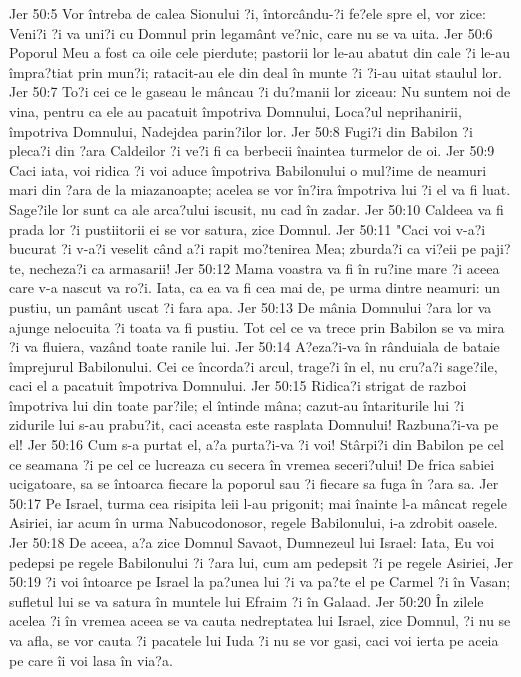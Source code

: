 Jer 50:5  Vor întreba de calea Sionului ?i, întorcându-?i fe?ele spre el, vor zice: Veni?i ?i va uni?i cu Domnul prin legamânt ve?nic, care nu se va uita.
Jer 50:6  Poporul Meu a fost ca oile cele pierdute; pastorii lor le-au abatut din cale ?i le-au împra?tiat prin mun?i; ratacit-au ele din deal în munte ?i ?i-au uitat staulul lor.
Jer 50:7  To?i cei ce le gaseau le mâncau ?i du?manii lor ziceau: Nu suntem noi de vina, pentru ca ele au pacatuit împotriva Domnului, Loca?ul neprihanirii, împotriva Domnului, Nadejdea parin?ilor lor.
Jer 50:8  Fugi?i din Babilon ?i pleca?i din ?ara Caldeilor ?i ve?i fi ca berbecii înaintea turmelor de oi.
Jer 50:9  Caci iata, voi ridica ?i voi aduce împotriva Babilonului o mul?ime de neamuri mari din ?ara de la miazanoapte; acelea se vor în?ira împotriva lui ?i el va fi luat. Sage?ile lor sunt ca ale arca?ului iscusit, nu cad în zadar.
Jer 50:10  Caldeea va fi prada lor ?i pustiitorii ei se vor satura, zice Domnul.
Jer 50:11  "Caci voi v-a?i bucurat ?i v-a?i veselit când a?i rapit mo?tenirea Mea; zburda?i ca vi?eii pe paji?te, necheza?i ca armasarii!
Jer 50:12  Mama voastra va fi în ru?ine mare ?i aceea care v-a nascut va ro?i. Iata, ca ea va fi cea mai de, pe urma dintre neamuri: un pustiu, un pamânt uscat ?i fara apa.
Jer 50:13  De mânia Domnului ?ara lor va ajunge nelocuita ?i toata va fi pustiu. Tot cel ce va trece prin Babilon se va mira ?i va fluiera, vazând toate ranile lui.
Jer 50:14  A?eza?i-va în rânduiala de bataie împrejurul Babilonului. Cei ce încorda?i arcul, trage?i în el, nu cru?a?i sage?ile, caci el a pacatuit împotriva Domnului.
Jer 50:15  Ridica?i strigat de razboi împotriva lui din toate par?ile; el întinde mâna; cazut-au întariturile lui ?i zidurile lui s-au prabu?it, caci aceasta este rasplata Domnului! Razbuna?i-va pe el!
Jer 50:16  Cum s-a purtat el, a?a purta?i-va ?i voi! Stârpi?i din Babilon pe cel ce seamana ?i pe cel ce lucreaza cu secera în vremea seceri?ului! De frica sabiei ucigatoare, sa se întoarca fiecare la poporul sau ?i fiecare sa fuga în ?ara sa.
Jer 50:17  Pe Israel, turma cea risipita leii l-au prigonit; mai înainte l-a mâncat regele Asiriei, iar acum în urma Nabucodonosor, regele Babilonului, i-a zdrobit oasele.
Jer 50:18  De aceea, a?a zice Domnul Savaot, Dumnezeul lui Israel: Iata, Eu voi pedepsi pe regele Babilonului ?i ?ara lui, cum am pedepsit ?i pe regele Asiriei,
Jer 50:19  ?i voi întoarce pe Israel la pa?unea lui ?i va pa?te el pe Carmel ?i în Vasan; sufletul lui se va satura în muntele lui Efraim ?i în Galaad.
Jer 50:20  În zilele acelea ?i în vremea aceea se va cauta nedreptatea lui Israel, zice Domnul, ?i nu se va afla, se vor cauta ?i pacatele lui Iuda ?i nu se vor gasi, caci voi ierta pe aceia pe care îi voi lasa în via?a.
